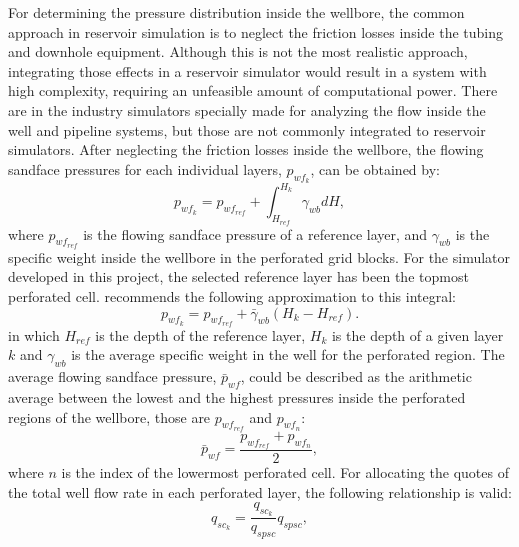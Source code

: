 For determining the pressure distribution inside the wellbore, the common approach in reservoir simulation is to neglect the friction losses inside the tubing and downhole equipment. Although this is not the most realistic approach, integrating those effects in a reservoir simulator would result in a system with high complexity, requiring an unfeasible amount of computational power. There are in the industry simulators specially made for analyzing the flow inside the well and pipeline systems, but those are not commonly integrated to reservoir simulators. After neglecting the friction losses inside the wellbore, the flowing sandface pressures for each individual layers, $p_{wf_k}$, can be obtained by:
\begin{equation}
\label{wm24}
p_{wf_k} = p_{wf_{ref}} + \int_{H_{ref}}^{H_k} \gamma_{wb} dH,
\end{equation}
where $p_{wf_{ref}}$ is the flowing sandface pressure of a reference layer, and $\gamma_{wb}$ is the specific weight inside the wellbore in the perforated grid blocks. For the simulator developed in this project, the selected reference layer has been the topmost perforated cell. \cite{Ertekin2001} recommends the following approximation to this integral:
\begin{equation}
\label{wm25}
p_{wf_k} = p_{wf_{ref}} + \bar{\gamma}_{wb} (H_k - H_{ref}).
\end{equation}
in which $H_{ref}$ is the depth of the reference layer, $H_k$ is the depth of a given layer $k$ and $\gamma_{wb}$ is the average specific weight in the well for the perforated region. The average flowing sandface pressure, $\bar{p}_{wf}$, could be described as the arithmetic average between the lowest and the highest pressures inside the perforated regions of the wellbore, those are $p_{{wf}_{ref}}$ and $p_{{wf}_n}$:
\begin{equation}
\label{wm26}
\bar{p}_{wf} = \frac{p_{wf_{ref}} + p_{wf_{n}}}{2},
\end{equation}
where $n$ is the index of the lowermost perforated cell. For allocating the quotes of the total well flow rate in each perforated layer, the following relationship is valid:
\begin{equation}
\label{wm32}
q_{sc_k} = \frac{q_{sc_k}}{q_{spsc}}q_{spsc},
\end{equation}
